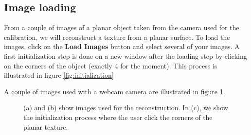 \documentclass[12pt]{article}
\begin{document}
\subsection{Image loading}
From a couple of images of a planar object taken from the camera used for the calibration, we will reconstruct a texture from a planar surface.
To load the images, click on the \textbf{Load Images} button and select several of your images. 
 A first initialization step is done on a new window after the loading step by clicking on the corners of the object (exactly 4 for the moment). This process is illustrated in figure \ref{fig:initialization}

A couple of images used with a webcam camera are illustrated in figure \ref{fig:recon_webcam}.
\begin{figure}[!ht]
    \centering
\caption{(a) and (b) show images used for the reconstruction. In (c), we show the initialization process where the user click the corners of the planar texture.}
\label{fig:recon_webcam}
\end{figure}
\end{document}
